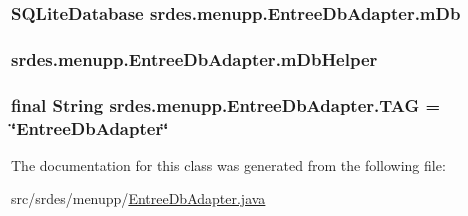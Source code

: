 \hypertarget{classsrdes_1_1menupp_1_1_entree_db_adapter_a272749736721c68b9f62bce3f2670290}{
\subsubsection[{m\-Db}]{\setlength{\rightskip}{0pt plus 5cm}\-S\-Q\-Lite\-Database {\bf srdes.\-menupp.\-Entree\-Db\-Adapter.\-m\-Db}}}\label{classsrdes_1_1menupp_1_1_entree_db_adapter_a272749736721c68b9f62bce3f2670290}
\hypertarget{classsrdes_1_1menupp_1_1_entree_db_adapter_a43c5b7fb87b489c57b21247e15a6bc64}{
\subsubsection[{m\-Db\-Helper}]{ {\bf srdes.\-menupp.\-Entree\-Db\-Adapter.\-m\-Db\-Helper}}}\label{classsrdes_1_1menupp_1_1_entree_db_adapter_a43c5b7fb87b489c57b21247e15a6bc64}
\hypertarget{classsrdes_1_1menupp_1_1_entree_db_adapter_a313cca340e543a5e43fd5c3872631b3f}{
\subsubsection[{\-T\-A\-G}]{\setlength{\rightskip}{0pt plus 5cm}final \-String {\bf srdes.\-menupp.\-Entree\-Db\-Adapter.\-T\-A\-G} = \char`\"{}\-Entree\-Db\-Adapter\char`\"{}}}\label{classsrdes_1_1menupp_1_1_entree_db_adapter_a313cca340e543a5e43fd5c3872631b3f}


\-The documentation for this class was generated from the following file\-:\begin{DoxyCompactItemize}
\item 
src/srdes/menupp/\hyperlink{_entree_db_adapter_8java}{\-Entree\-Db\-Adapter.\-java}\end{DoxyCompactItemize}
